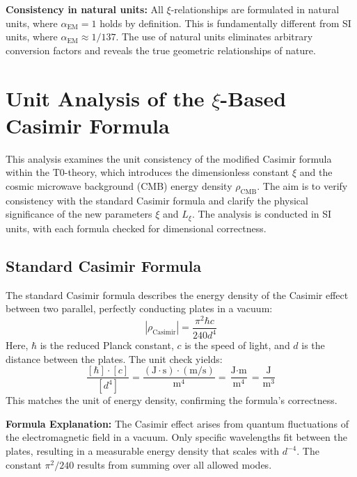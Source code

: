 \documentclass[12pt,a4paper]{article}
\begin{document}
	\textbf{Consistency in natural units:}
	All $\xi$-relationships are formulated in natural units, where $\alpha_{\text{EM}} = 1$ holds by definition. This is fundamentally different from SI units, where $\alpha_{\text{EM}} \approx 1/137$. The use of natural units eliminates arbitrary conversion factors and reveals the true geometric relationships of nature.
	\section{Unit Analysis of the $\xi$-Based Casimir Formula}
This analysis examines the unit consistency of the modified Casimir formula within the T0-theory, which introduces the dimensionless constant $\xi$ and the cosmic microwave background (CMB) energy density $\rho_{\text{CMB}}$. The aim is to verify consistency with the standard Casimir formula and clarify the physical significance of the new parameters $\xi$ and $L_\xi$. The analysis is conducted in SI units, with each formula checked for dimensional correctness.

\subsection{Standard Casimir Formula}
The standard Casimir formula describes the energy density of the Casimir effect between two parallel, perfectly conducting plates in a vacuum:
\begin{equation}
	|\rho_{\text{Casimir}}| = \frac{\pi^2 \hbar c}{240 d^4}
\end{equation}
Here, $\hbar$ is the reduced Planck constant, $c$ is the speed of light, and $d$ is the distance between the plates. The unit check yields:
\begin{equation}
	\frac{[\hbar] \cdot [c]}{[d^4]} = \frac{(\text{J} \cdot \text{s}) \cdot (\text{m}/\text{s})}{\text{m}^4} = \frac{\text{J} \cdot \text{m}}{\text{m}^4} = \frac{\text{J}}{\text{m}^3}
\end{equation}
This matches the unit of energy density, confirming the formula’s correctness.

\textbf{Formula Explanation:} The Casimir effect arises from quantum fluctuations of the electromagnetic field in a vacuum. Only specific wavelengths fit between the plates, resulting in a measurable energy density that scales with $d^{-4}$. The constant $\pi^2/240$ results from summing over all allowed modes.
\end{document}
